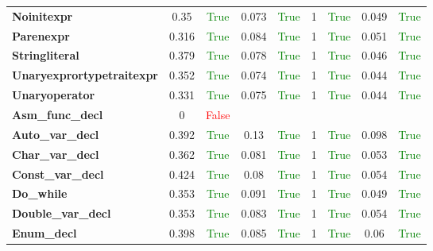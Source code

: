 \documentclass{article}
\begin{document}
\begin{xltabular}{\textwidth}{lcccccccc}
\textbf{{\fontsize{10}{12}\selectfont Noinitexpr}}& 0.35&\textcolor{green}{True}& 0.073&\textcolor{green}{True}& 1&\textcolor{green}{True}& 0.049&\textcolor{green}{True} \\[0.5ex]
\textbf{{\fontsize{10}{12}\selectfont Parenexpr}}& 0.316&\textcolor{green}{True}& 0.084&\textcolor{green}{True}& 1&\textcolor{green}{True}& 0.051&\textcolor{green}{True} \\[0.5ex]
\textbf{{\fontsize{10}{12}\selectfont Stringliteral}}& 0.379&\textcolor{green}{True}& 0.078&\textcolor{green}{True}& 1&\textcolor{green}{True}& 0.046&\textcolor{green}{True} \\[0.5ex]
\textbf{{\fontsize{10}{12}\selectfont Unaryexprortypetraitexpr}}& 0.352&\textcolor{green}{True}& 0.074&\textcolor{green}{True}& 1&\textcolor{green}{True}& 0.044&\textcolor{green}{True} \\[0.5ex]
\textbf{{\fontsize{10}{12}\selectfont Unaryoperator}}& 0.331&\textcolor{green}{True}& 0.075&\textcolor{green}{True}& 1&\textcolor{green}{True}& 0.044&\textcolor{green}{True} \\[0.5ex]
\textbf{{\fontsize{10}{12}\selectfont Asm\_func\_decl}}& 0&\textcolor{red}{False} \\[0.5ex]
\textbf{{\fontsize{10}{12}\selectfont Auto\_var\_decl}}& 0.392&\textcolor{green}{True}& 0.13&\textcolor{green}{True}& 1&\textcolor{green}{True}& 0.098&\textcolor{green}{True} \\[0.5ex]
\textbf{{\fontsize{10}{12}\selectfont Char\_var\_decl}}& 0.362&\textcolor{green}{True}& 0.081&\textcolor{green}{True}& 1&\textcolor{green}{True}& 0.053&\textcolor{green}{True} \\[0.5ex]
\textbf{{\fontsize{10}{12}\selectfont Const\_var\_decl}}& 0.424&\textcolor{green}{True}& 0.08&\textcolor{green}{True}& 1&\textcolor{green}{True}& 0.054&\textcolor{green}{True} \\[0.5ex]
\textbf{{\fontsize{10}{12}\selectfont Do\_while}}& 0.353&\textcolor{green}{True}& 0.091&\textcolor{green}{True}& 1&\textcolor{green}{True}& 0.049&\textcolor{green}{True} \\[0.5ex]
\textbf{{\fontsize{10}{12}\selectfont Double\_var\_decl}}& 0.353&\textcolor{green}{True}& 0.083&\textcolor{green}{True}& 1&\textcolor{green}{True}& 0.054&\textcolor{green}{True} \\[0.5ex]
\textbf{{\fontsize{10}{12}\selectfont Enum\_decl}}& 0.398&\textcolor{green}{True}& 0.085&\textcolor{green}{True}& 1&\textcolor{green}{True}& 0.06&\textcolor{green}{True} \\[0.5ex]

\end{xltabular}
\end{document}
